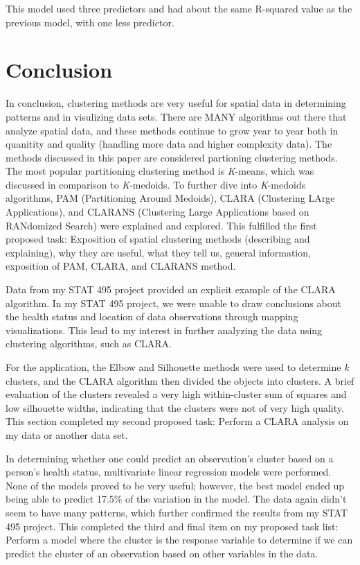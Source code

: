 \documentclass[12pt,twoside]{amherstthesis}
\begin{document}
  This model used three predictors and had about the same R-squared value
  as the previous model, with one less predictor.
  
  \chapter*{Conclusion}\label{conclusion}
  
  \setcounter{chapter}{4} \setcounter{section}{0}
  
  In conclusion, clustering methods are very useful for spatial data in
  determining patterns and in visulizing data sets. There are MANY
  algorithms out there that analyze spatial data, and these methods
  continue to grow year to year both in quanitity and quality (handling
  more data and higher complexity data). The methods discussed in this
  paper are considered partioning clustering methods. The most popular
  partitioning clustering method is \emph{K}-means, which was discussed in
  comparison to \emph{K}-medoids. To further dive into \emph{K}-medoids
  algorithms, PAM (Partitioning Around Medoids), CLARA (Clustering LArge
  Applications), and CLARANS (Clustering Large Applications based on
  RANdomized Search) were explained and explored. This fulfilled the first
  proposed task: Exposition of spatial clustering methods (describing and
  explaining), why they are useful, what they tell us, general
  information, exposition of PAM, CLARA, and CLARANS method.
  
  Data from my STAT 495 project provided an explicit example of the CLARA
  algorithm. In my STAT 495 project, we were unable to draw conclusions
  about the health status and location of data observations through
  mapping visualizations. This lead to my interest in further analyzing
  the data using clustering algorithms, such as CLARA.
  
  For the application, the Elbow and Silhouette methods were used to
  determine \emph{k} clusters, and the CLARA algorithm then divided the
  objects into clusters. A brief evaluation of the clusters revealed a
  very high within-cluster sum of squares and low silhouette widths,
  indicating that the clusters were not of very high quality. This section
  completed my second proposed task: Perform a CLARA analysis on my data
  or another data set.
  
  In determining whether one could predict an observation's cluster based
  on a person's health status, multivariate linear regression models were
  performed. None of the models proved to be very useful; however, the
  best model ended up being able to predict 17.5\% of the variation in the
  model. The data again didn't seem to have many patterns, which further
  confirmed the results from my STAT 495 project. This completed the third
  and final item on my proposed task list: Perform a model where the
  cluster is the response variable to determine if we can predict the
  cluster of an observation based on other variables in the data.
  
\end{document}

